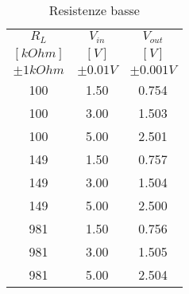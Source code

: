\begin{table}[H]
\centering
\caption{Resistenze basse}
\begin{tabular}{|c|c|c|}
\hline
$R_L$	&	$V_{in}$ 	&	$V_{out}$	\\
$[kOhm]$	&	$[V]$	&	$[V]$	\\
$\pm 1 kOhm$ 	&	$\pm 0.01 V$	&	$\pm 0.001 V$	\\ \hline
100	&	1.50	&	0.754	\\
100	&	3.00	&	1.503	\\
100	&	5.00	&	2.501	\\ \hline
149	&	1.50	&	0.757	\\
149	&	3.00	&	1.504	\\
149	&	5.00	&	2.500	\\ \hline
981	&	1.50	&	0.756	\\
981	&	3.00	&	1.505	\\
981	&	5.00	&	2.504	\\ \hline
\end{tabular}
\label{}
\end{table}